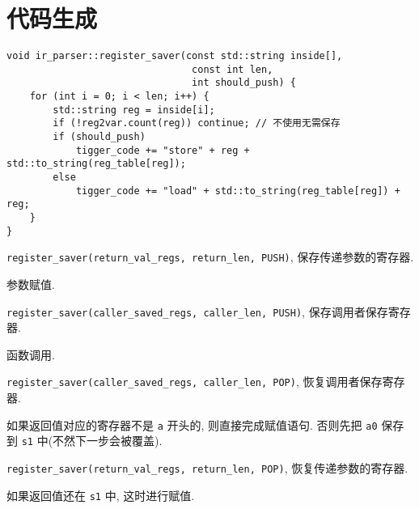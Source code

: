 \documentclass[11pt]{article}
\begin{document}
    \section{代码生成}
    \begin{verbatim}
void ir_parser::register_saver(const std::string inside[],
                                const int len,
                                int should_push) {
    for (int i = 0; i < len; i++) {
        std::string reg = inside[i];
        if (!reg2var.count(reg)) continue; // 不使用无需保存
        if (should_push)
            tigger_code += "store" + reg + std::to_string(reg_table[reg]);
        else
            tigger_code += "load" + std::to_string(reg_table[reg]) + reg;
    }
}
    \end{verbatim}

    \begin{compactenum}[(i)]
        \item \texttt{register\_saver(return\_val\_regs, return\_len, PUSH)}, 保存传递参数的寄存器.
        \item 参数赋值.
        \item \texttt{register\_saver(caller\_saved\_regs, caller\_len, PUSH)}, 保存调用者保存寄存器.
        \item 函数调用.
        \item \texttt{register\_saver(caller\_saved\_regs, caller\_len, POP)}, 恢复调用者保存寄存器.
        \item 如果返回值对应的寄存器不是 \texttt{a} 开头的, 则直接完成赋值语句. 否则先把 \texttt{a0} 保存到 \texttt{s1} 中(不然下一步会被覆盖).
        \item \texttt{register\_saver(return\_val\_regs, return\_len, POP)}, 恢复传递参数的寄存器.
        \item 如果返回值还在 \texttt{s1} 中, 这时进行赋值.
    \end{compactenum}
    
\end{document}
